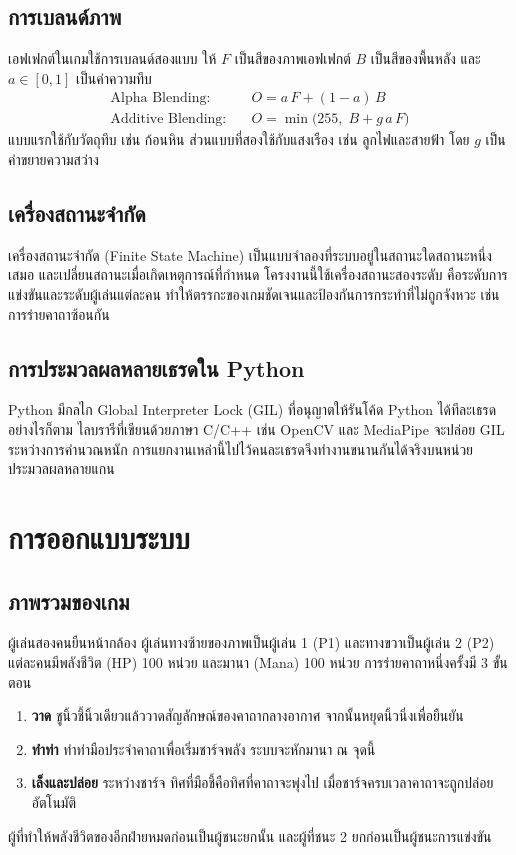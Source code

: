\documentclass[12pt,a4paper]{report}
\begin{document}
\section{การเบลนด์ภาพ}
เอฟเฟกต์ในเกมใช้การเบลนด์สองแบบ ให้ $F$ เป็นสีของภาพเอฟเฟกต์ $B$ เป็นสีของพื้นหลัง และ $a \in [0,1]$ เป็นค่าความทึบ
\begin{align}
  \text{Alpha Blending:}\quad & O = a\,F + (1-a)\,B \\
  \text{Additive Blending:}\quad & O = \min\bigl(255,\; B + g\,a\,F\bigr)
\end{align}
แบบแรกใช้กับวัตถุทึบ เช่น ก้อนหิน ส่วนแบบที่สองใช้กับแสงเรือง เช่น ลูกไฟและสายฟ้า โดย $g$ เป็นค่าขยายความสว่าง

\section{เครื่องสถานะจำกัด}
เครื่องสถานะจำกัด (Finite State Machine) เป็นแบบจำลองที่ระบบอยู่ในสถานะใดสถานะหนึ่งเสมอ
และเปลี่ยนสถานะเมื่อเกิดเหตุการณ์ที่กำหนด โครงงานนี้ใช้เครื่องสถานะสองระดับ คือระดับการแข่งขันและระดับผู้เล่นแต่ละคน
ทำให้ตรรกะของเกมชัดเจนและป้องกันการกระทำที่ไม่ถูกจังหวะ เช่น การร่ายคาถาซ้อนกัน

\section{การประมวลผลหลายเธรดใน Python}
Python มีกลไก Global Interpreter Lock (GIL) ที่อนุญาตให้รันโค้ด Python ได้ทีละเธรด
อย่างไรก็ตาม ไลบรารีที่เขียนด้วยภาษา C/C++ เช่น OpenCV และ MediaPipe จะปล่อย GIL ระหว่างการคำนวณหนัก
การแยกงานเหล่านี้ไปไว้คนละเธรดจึงทำงานขนานกันได้จริงบนหน่วยประมวลผลหลายแกน

\chapter{การออกแบบระบบ}

\section{ภาพรวมของเกม}
ผู้เล่นสองคนยืนหน้ากล้อง ผู้เล่นทางซ้ายของภาพเป็นผู้เล่น 1 (P1) และทางขวาเป็นผู้เล่น 2 (P2)
แต่ละคนมีพลังชีวิต (HP) 100 หน่วย และมานา (Mana) 100 หน่วย การร่ายคาถาหนึ่งครั้งมี 3 ขั้นตอน
\begin{enumerate}[leftmargin=2cm]
  \item \textbf{วาด} ชูนิ้วชี้นิ้วเดียวแล้ววาดสัญลักษณ์ของคาถากลางอากาศ จากนั้นหยุดนิ้วนิ่งเพื่อยืนยัน
  \item \textbf{ทำท่า} ทำท่ามือประจำคาถาเพื่อเริ่มชาร์จพลัง ระบบจะหักมานา ณ จุดนี้
  \item \textbf{เล็งและปล่อย} ระหว่างชาร์จ ทิศที่มือชี้คือทิศที่คาถาจะพุ่งไป เมื่อชาร์จครบเวลาคาถาจะถูกปล่อยอัตโนมัติ
\end{enumerate}
ผู้ที่ทำให้พลังชีวิตของอีกฝ่ายหมดก่อนเป็นผู้ชนะยกนั้น และผู้ที่ชนะ 2 ยกก่อนเป็นผู้ชนะการแข่งขัน
\end{document}
